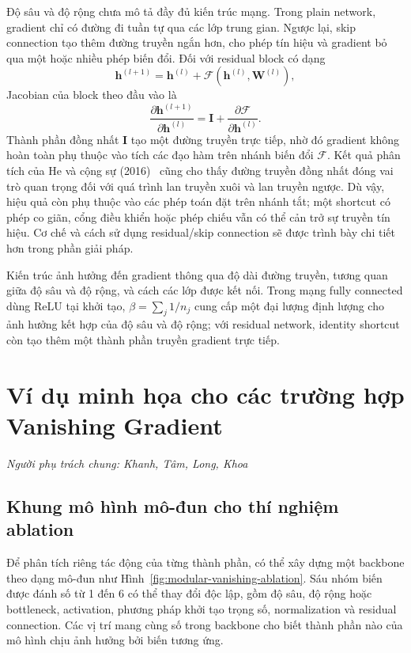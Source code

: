 \documentclass[12pt]{article}
\begin{document}
Độ sâu và độ rộng chưa mô tả đầy đủ kiến trúc mạng. Trong plain network,
gradient chỉ có đường đi tuần tự qua các lớp trung gian. Ngược lại, skip
connection tạo thêm đường truyền ngắn hơn, cho phép tín hiệu và gradient bỏ qua
một hoặc nhiều phép biến đổi. Đối với residual block có dạng
\[
    \mathbf{h}^{(l+1)}
    =\mathbf{h}^{(l)}
    +\mathcal{F}\!\left(\mathbf{h}^{(l)},\mathbf{W}^{(l)}\right),
\]
Jacobian của block theo đầu vào là
\[
    \frac{\partial\mathbf{h}^{(l+1)}}{\partial\mathbf{h}^{(l)}}
    =\mathbf{I}
    +\frac{\partial\mathcal{F}}{\partial\mathbf{h}^{(l)}}.
\]
Thành phần đồng nhất $\mathbf{I}$ tạo một đường truyền trực tiếp, nhờ đó
gradient không hoàn toàn phụ thuộc vào tích các đạo hàm trên nhánh biến đổi
$\mathcal{F}$. Kết quả phân tích của He và cộng sự
(2016)~\cite{he2016identity} cũng cho thấy đường truyền đồng nhất đóng vai trò
quan trọng đối với quá trình lan truyền xuôi và lan truyền ngược. Dù vậy, hiệu
quả còn phụ thuộc vào các phép toán đặt trên nhánh
tắt; một shortcut có phép co giãn, cổng điều khiển hoặc phép chiếu vẫn có thể
cản trở sự truyền tín hiệu. Cơ chế và cách sử dụng residual/skip connection sẽ
được trình bày chi tiết hơn trong phần giải pháp.

\begin{notebox}
Kiến trúc ảnh hưởng đến gradient thông qua độ dài đường truyền, tương quan
giữa độ sâu và độ rộng, và cách các lớp được kết nối. Trong mạng fully
connected dùng ReLU tại khởi tạo, $\beta=\sum_j 1/n_j$ cung cấp một đại lượng
định lượng cho ảnh hưởng kết hợp của độ sâu và độ rộng; với residual network,
identity shortcut còn tạo thêm một thành phần truyền gradient trực tiếp.
\end{notebox}

\section{Ví dụ minh họa cho các trường hợp Vanishing Gradient}
\textit{Người phụ trách chung: Khanh, Tâm, Long, Khoa}

\subsection{Khung mô hình mô-đun cho thí nghiệm ablation}

Để phân tích riêng tác động của từng thành phần, có thể xây dựng một backbone
theo dạng mô-đun như Hình~\ref{fig:modular-vanishing-ablation}. Sáu nhóm biến
được đánh số từ 1 đến 6 có thể thay đổi độc lập, gồm độ sâu, độ rộng hoặc
bottleneck, activation, phương pháp khởi tạo trọng số, normalization và
residual connection. Các vị trí mang cùng số trong backbone cho biết thành
phần nào của mô hình chịu ảnh hưởng bởi biến tương ứng.
\end{document}
